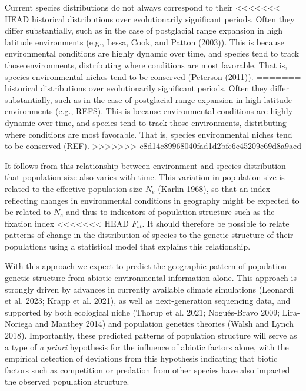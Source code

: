 \documentclass[
]{article}
\begin{document}
Current species distributions do not always correspond to their
<<<<<<< HEAD
historical distributions over evolutionarily significant periods. Often
they differ substantially, such as in the case of postglacial range
expansion in high latitude environments (e.g., Lessa, Cook, and Patton
(2003)). This is because environmental conditions are highly dynamic
over time, and species tend to track those environments, distributing
where conditions are most favorable. That is, species environmental
niches tend to be conserved (Peterson (2011)).
=======
historical distributions over evolutionarily significant periods. Often they differ substantially, such as in the case of postglacial range expansion in high latitude environments (e.g., REFS). This
is because environmental conditions are highly dynamic over time, and species
tend to track those environments, distributing where conditions are most favorable. That is, species environmental niches tend to be conserved (REF).
>>>>>>> e8d14c89968040fad1d2bfc6c45209e69d8a9aed

It follows from this relationship between environment and species
distribution that population size also varies with time. This variation
in population size is related to the effective population size \(N_e\)
(Karlin 1968), so that an index reflecting changes in environmental
conditions in geography might be expected to be related to \(N_e\) and
thus to indicators of population structure such as the fixation index
<<<<<<< HEAD
\(F_{st}\). It should therefore be possible to relate patterns of change
in the distribution of species to the genetic structure of their
populations using a statistical model that explains this relationship.

With this approach we expect to predict the geographic pattern of
population-genetic structure from abiotic environmental information
alone. This approach is strongly driven by advances in currently
available climate simulations (Leonardi et al. 2023; Krapp et al. 2021),
as well as next-generation sequencing data, and supported by both
ecological niche (Thorup et al. 2021; Nogués-Bravo 2009; Lira-Noriega
and Manthey 2014) and population genetics theories (Walsh and Lynch
2018). Importantly, these predicted patterns of population structure
will serve as a type of \textit{a priori} hypothesis for the influence
of abiotic factors alone, with the empirical detection of deviations
from this hypothesis indicating that biotic factors such as competition
or predation from other species have also impacted the observed
population structure.
\end{document}
